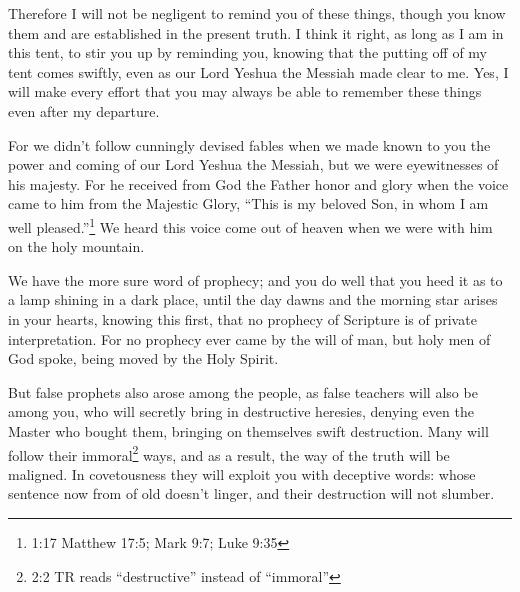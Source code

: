 \myverse{}Therefore I will not be negligent to remind you of these things,
though you know them and are established in the present truth.
\myverse{}I think it right, as long as I am in this tent, to stir you up by reminding
you,
\myverse{}knowing that the putting off of my tent comes swiftly, even as our Lord Yeshua the Messiah
made clear to me.
\myverse{}Yes, I will make every effort that you may always be able to remember these
things even after my departure.

\myverse{}For we didn’t follow cunningly devised fables when we made known
to you the power and coming of our Lord Yeshua the Messiah, but we were eyewitnesses of his majesty.
\myverse{}For he received from God the Father honor and glory when the voice came to
him from the Majestic Glory, “This is my beloved Son, in whom I am well pleased.”\footnote{1:17 Matthew 17:5;
	Mark 9:7;
	Luke 9:35}
\myverse{}We heard this voice come out of heaven when we were with him on the holy mountain.

\myverse{}We have the more sure word of prophecy; and you do well that
you heed it as to a lamp shining in a dark place, until the day dawns and the morning star arises in your
hearts,
\myverse{}knowing this first, that no prophecy of Scripture is of private interpretation.
\myverse{}For no prophecy ever came by the will of man, but holy men of God spoke, being
moved by the Holy Spirit.


\mychapter{} \myverse*{}But false prophets also arose among the people, as false teachers
will also be among you, who will secretly bring in destructive heresies, denying even the Master who bought
them, bringing on themselves swift destruction.
\myverse{}Many will follow their immoral\footnote{2:2 TR reads “destructive” instead of “immoral”} ways, and as a result, the way of the truth
will be maligned.
\myverse{}In covetousness they will exploit you with deceptive words: whose sentence now
from of old doesn’t linger, and their destruction will not slumber.


